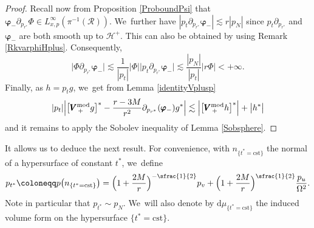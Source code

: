 \documentclass[JEP,XML,SOM,Unicode,published]{cedram}
\theoremstyle{plain}
\theoremstyle{definition}
\renewcommand\H{{\mathcal{H}^+}}
\newcommand\dr{{\mathrm{d}}}
\begin{document}
\begin{proof}
Recall now from Proposition \ref{ProboundPsi} that $\pmb{\varphi}_- \partial_{p_{r^*}} \Phi \in L^\infty_{x,p} (\pi^{-1}(\mathcal{R}))$. We~further have $|p_t\partial_{p_{r^*}} \pmb{\varphi}_-| \lesssim r|p_N|$ since $p_t \partial_{p_{r^*}}$ and $\pmb{\varphi}_-$ are both smooth up to $\H$. This can also be obtained by using Remark \ref{RkvarphiHplus}. Consequently,
\[
\big| \Phi \partial_{p_{r^*}} \pmb{\varphi}_- \big| \lesssim \frac{1}{|p_t|}|\Phi| \big| p_t \partial_{p_{r^*}} \pmb{\varphi}_- \big| \lesssim \frac{|p_N|}{|p_t|}|r\Phi| <+\infty.
\]
Finally, as $h=p_t g$, we~get from Lemma \ref{identityVplusp}
\[
|p_t| \Bigl | \bigl[ \pmb{V}_{\, +}^{ \mathrm{mod}} g \bigr]^* -\frac{r-3M}{r^2} \partial_{p_{r^*}}(\pmb{\varphi}_-) g^* \Bigr| \lesssim \Bigl | \bigl[ \pmb{V}_{\, +}^{ \mathrm{mod}} h \bigr]^* \Bigr|+\big|h^* \big|
\]
and it remains to apply the Sobolev inequality of Lemma \ref{Sobsphere}.
\end{proof}

It allows us to deduce the next result. For convenience, with $n_{\{t^*= \textrm{cst}\}}$ the normal of a hypersurface of constant $t^*$, we~define
\begin{equation}\label{eq:defnormal}
p_{t^*} \coloneqq p \bigl(n_{\{t^*= \textrm{cst} \}} \bigr) = \Bigl(1+\frac{2M}{r} \Bigr)^{-\sfrac{1}{2}} p_v+\Bigl(1+\frac{2M}{r}\Bigr)^{\sfrac{1}{2}}\frac{p_u}{\Omega^2}.
\end{equation}
Note in particular that $p_{t^*} \sim p_N$. We~will also denote by $\dr \mu_{\{ t^*=\textrm{cst}\} }$ the induced volume form on the hypersurface $\{ t^*=\textrm{cst}\}$.
\end{document}
